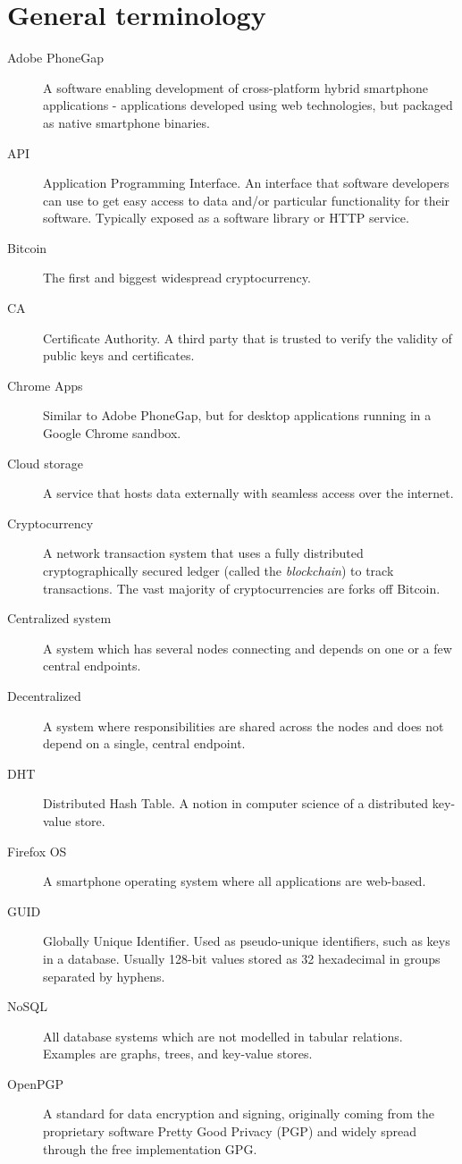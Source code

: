 \section{General terminology}
\begin{description}
  \item[Adobe PhoneGap] A software enabling development of cross-platform hybrid smartphone applications - applications developed using web technologies, but packaged as native smartphone binaries.
  \item[API] Application Programming Interface. An interface that software developers can use to get easy access to data and/or particular functionality for their software. Typically exposed as a software library or HTTP service.
  \item[Bitcoin] The first and biggest widespread cryptocurrency.
  \item[CA] Certificate Authority. A third party that is trusted to verify the validity of public keys and certificates.
  \item[Chrome Apps] Similar to Adobe PhoneGap, but for desktop applications running in a Google Chrome sandbox.
  \item[Cloud storage] A service that hosts data externally with seamless access over the internet.
  \item[Cryptocurrency] A network transaction system that uses a fully distributed cryptographically secured ledger (called the \emph{blockchain}) to track transactions. The vast majority of cryptocurrencies are forks off Bitcoin.
  \item[Centralized system] A system which has several nodes connecting and depends on one or a few central endpoints.
  \item[Decentralized] A system where responsibilities are shared across the nodes and does not depend on a single, central endpoint.
  \item[DHT] Distributed Hash Table. A notion in computer science of a distributed key-value store.
  \item[Firefox OS] A smartphone operating system where all applications are web-based.
  \item[GUID] Globally Unique Identifier. Used as pseudo-unique identifiers, such as keys in a database. Usually 128-bit values stored as 32 hexadecimal in groups separated by hyphens.
  \item[NoSQL] All database systems which are not modelled in tabular relations. Examples are graphs, trees, and key-value stores.
  \item[OpenPGP] A standard for data encryption and signing, originally coming from the proprietary software Pretty Good Privacy (PGP) and widely spread through the free implementation GPG.

\end{description}
